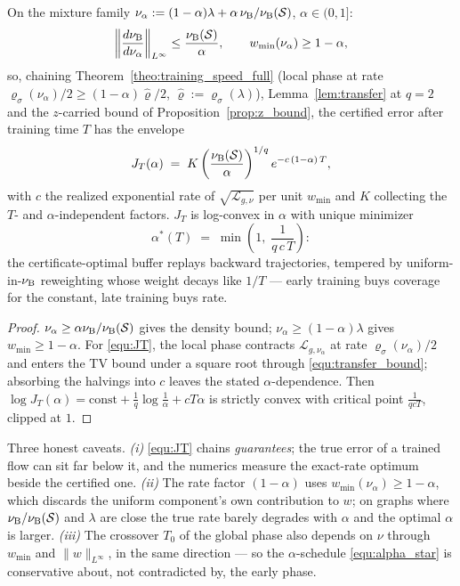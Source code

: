 \begin{proposition}\label{prop:alpha_star}
On the mixture family $\nu_\alpha:=(1-\alpha)\lambda+\alpha\,\nu_{\mathrm{B}}/\nu_{\mathrm{B}}(\mathcal S)$,
$\alpha\in(0,1]$:
\begin{equation*}
    \left\|\frac{d\nu_{\mathrm{B}}}{d\nu_\alpha}\right\|_{L^\infty}\leq\frac{\nu_{\mathrm{B}}(\mathcal S)}{\alpha},
    \qquad w_{\min}(\nu_\alpha)\geq1-\alpha ,
\end{equation*}
so, chaining Theorem~\ref{theo:training_speed_full} (local phase at rate
$\varrho_\sigma(\nu_\alpha)/2\geq(1-\alpha)\widehat\varrho/2$,
$\widehat\varrho:=\varrho_\sigma(\lambda)$), Lemma~\ref{lem:transfer} at $q=2$ and the
$z$-carried bound of Proposition~\ref{prop:z_bound}, the certified error after training
time $T$ has the envelope
\begin{equation}\label{equ:JT}
    J_T(\alpha)\;=\;K\left(\frac{\nu_{\mathrm{B}}(\mathcal S)}{\alpha}\right)^{1/q}
    e^{-c\,(1-\alpha)\,T},
\end{equation}
with $c$ the realized exponential rate of $\sqrt{\mathcal L_{g,\nu}}$ per unit
$w_{\min}$ and $K$ collecting the $T$- and $\alpha$-independent factors. $J_T$ is
log-convex in $\alpha$ with unique minimizer
\begin{equation}\label{equ:alpha_star}
    \alpha^*(T)\;=\;\min\left(1,\;\frac{1}{q\,c\,T}\right):
\end{equation}
the certificate-optimal buffer replays backward trajectories, tempered by
uniform-in-$\nu_{\mathrm{B}}$ reweighting whose weight decays like $1/T$ --- early training buys
coverage for the constant, late training buys rate.
\end{proposition}

\begin{proof}
$\nu_\alpha\geq\alpha\nu_{\mathrm{B}}/\nu_{\mathrm{B}}(\mathcal S)$ gives the density bound;
$\nu_\alpha\geq(1-\alpha)\lambda$ gives $w_{\min}\geq1-\alpha$. For \eqref{equ:JT}, the
local phase contracts $\mathcal L_{g,\nu_\alpha}$ at rate $\varrho_\sigma(\nu_\alpha)/2$
and enters the TV bound under a square root through \eqref{equ:transfer_bound};
absorbing the halvings into $c$ leaves the stated $\alpha$-dependence. Then
$\log J_T(\alpha)=\mathrm{const}+\frac1q\log\frac1\alpha+c T\alpha$ is strictly convex
with critical point $\frac{1}{qcT}$, clipped at $1$.
\end{proof}

Three honest caveats. \emph{(i)} \eqref{equ:JT} chains \emph{guarantees}; the true error
of a trained flow can sit far below it, and the numerics measure the exact-rate optimum
beside the certified one. \emph{(ii)} The rate factor $(1-\alpha)$ uses
$w_{\min}(\nu_\alpha)\geq1-\alpha$, which discards the uniform component's own
contribution to $w$; on graphs where $\nu_{\mathrm{B}}/\nu_{\mathrm{B}}(\mathcal S)$ and $\lambda$ are
close the true rate barely degrades with $\alpha$ and the optimal $\alpha$ is larger.
\emph{(iii)} The crossover $T_0$ of the global phase also depends on $\nu$ through
$w_{\min}$ and $\|w\|_{L^\infty}$, in the same direction --- so the $\alpha$-schedule
\eqref{equ:alpha_star} is conservative about, not contradicted by, the early phase.

